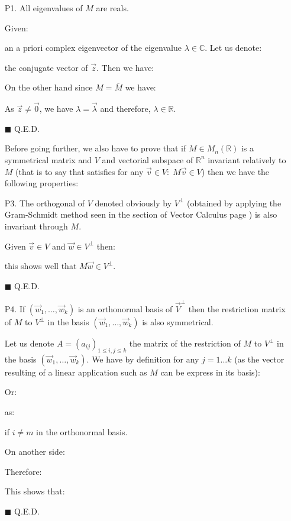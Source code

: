 	\begin{enumerate}
		\item[P1.] All eigenvalues of $M$ are reals.
		\begin{dem}
		Given:
		
		an a priori complex eigenvector of the eigenvalue $\lambda \in \mathbb{C}$. Let us denote:
				
		the conjugate vector of $\vec{z}$. Then we have:
		
		On the other hand since $M=\overline{M}$ we have:
		
		As $\vec{z} \neq \vec{0}$, we have $\lambda=\vec{\lambda}$ and therefore, $\lambda\in \mathbb{R}$.
		\begin{flushright}
		$\blacksquare$  Q.E.D.
		\end{flushright}
		\end{dem}
		Before going further, we also have to prove that if $M\in M_n(\mathbb{R})$ is a symmetrical matrix and $V$ and vectorial subspace of $\mathbb{R}^n$ invariant relatively to $M$ (that is to say that satisfies for any $\vec{v}\in V: \; M\vec{v}\in V$) then we have the following properties:
		
		\item[P3.] The orthogonal of $V$ denoted obviously by $V^\perp$ (obtained by applying the Gram-Schmidt method seen in the section of Vector Calculus page \pageref{gram-schmidt procedure}) is also invariant through $M$.
		
		\begin{dem}
		Given $\vec{v}\in V$ and $\vec{w}\in V^\perp$ then:
		
		this shows well that $M\vec{w}\in V^\perp$.
		\begin{flushright}
		$\blacksquare$  Q.E.D.
		\end{flushright}
		\end{dem}

		\item[P4.] If $(\vec{w}_1,\ldots,\vec{w}_k)$ is an orthonormal basis of $\vec{V}^\perp$ then the restriction matrix of $M$ to $V^\perp$ in the basis $(\vec{w}_1,\ldots,\vec{w}_k)$  is also symmetrical.
		\begin{dem}
		
		Let us denote $A=(a_{ij})_{1\leq i,j\leq k}$ the matrix of the restriction of $M$ to $V^\perp$ in the basis $(\vec{w}_1,\ldots,\vec{w}_k)$. We have by definition for any $j=1...k$ (as the vector resulting of a linear application such as $M$ can be express in its basis):
		
		Or:
		
		as:
		
		if $i\neq m$ in the orthonormal basis.
		
		On another side:
		
		Therefore:
		
		This shows that:
				
		\begin{flushright}
		$\blacksquare$  Q.E.D.
		\end{flushright}
		\end{dem}
	\end{enumerate}
